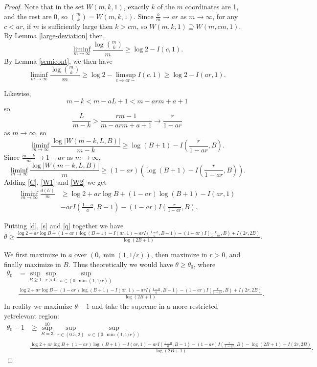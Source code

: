 \documentclass[12 pt]{article}
\begin{document}
\begin{proof}
Note that in the set $W(m, k, 1)$, exactly $k$ of the $m$ coordinates are 1,
and the rest are 0, so ${m \choose k} = W(m, k, 1)$. Since $\frac km \to ar$
as $m \to \infty$, for any $c < ar$, if $m$ is sufficiently large then $k > cm$,
so $W(m, k, 1) \supseteq W(m, cm, 1)$. By Lemma \ref{large-deviation} then,
\begin{equation}\label{C}
\liminf_{m\to\infty} \frac{\log{m \choose k}}m
\ge \log2 - I\left( c, 1 \right).
\end{equation}
By Lemma \ref{semicont}, we then have
\[
\liminf_{m\to\infty} \frac{\log{m \choose k}}m
\ge \log2 - \limsup_{c\to ar-} I\left( c, 1 \right) \ge \log2 - I(ar, 1).
\]

Likewise,
\[
m - k < m - aL + 1 < m - arm + a + 1
\]
so
\[
\frac{L}{m - k} > \frac{rm - 1}{m - arm + a + 1} \to \frac{r}{1 - ar}
\]
as $m \to \infty$, so
\[
\liminf_{m\to\infty} \frac{\log|W(m - k, L, B)|}{m - k} \ge \log(B + 1) - I\left(\frac r{1 - ar}, B\right).
\]
Since $\frac{m-k}m \to 1 - ar$ as $m \to \infty$,
\begin{equation}\label{W2}
\liminf_{m\to\infty} \frac{\log|W(m - k, L, B)|}m \ge (1 - ar)\left( \log(B + 1) - I\left(\frac r{1 - ar}, B\right) \right).
\end{equation}
Adding \eqref{C}, \eqref{W1} and \eqref{W2} we get
\begin{align}
\nonumber
\liminf_{m\to\infty} \frac{d(U)}m
&\ge \log2 + ar\log B + (1 - ar)\log(B + 1) - I(ar, 1)\\
&- arI\left( \frac{1-a}a, B - 1 \right) - (1 - ar)I\left(\frac r{1 - ar}, B\right).
\label{d}
\end{align}

Putting \eqref{d}, \eqref{s} and \eqref{q} together we have
\[
\theta \ge \tfrac{\log2 + ar\log B + (1 - ar)\log(B + 1) - I(ar, 1) - arI\left( \frac{1-a}a, B - 1 \right) - (1 - ar)I\left(\frac r{1 - ar}, B\right) + I(2r, 2B)}{\log(2B + 1)}.
\]

We first maximize in $a$ over $(0, \min(1, 1/r))$, then maximize in $r > 0$,
and finally maximize in $B$. Thus theoretically we would have $\theta \ge \theta_0$,
where
\begin{align*}
\theta_0 &= \sup_{B\ge1}\sup_{r>0}\sup_{a\in(0,\min(1,1/r))}\\
&\tfrac{\log2 + ar\log B + (1 - ar)\log(B + 1) - I(ar, 1) - arI\left( \frac{1-a}a, B - 1 \right) - (1 - ar)I\left(\frac r{1 - ar}, B\right) + I(2r, 2B)}{\log(2B + 1)}.
\end{align*}
In reality we maximize $\theta - 1$ and take the supreme in a more restricted yetrelevant region:
\begin{align*}
\theta_0 - 1 &\ge \sup_{B=3}^{10}\sup_{r\in(0.5,2)}\sup_{a\in(0,\min(1,1/r))}\\
&\tfrac{\log2 + ar\log B + (1 - ar)\log(B + 1) - I(ar, 1) - arI\left( \frac{1-a}a, B - 1 \right) - (1 - ar)I\left(\frac r{1 - ar}, B\right) - \log(2B + 1) + I(2r, 2B)}{\log(2B + 1)}.
\end{align*}


\end{proof}
\end{document}
